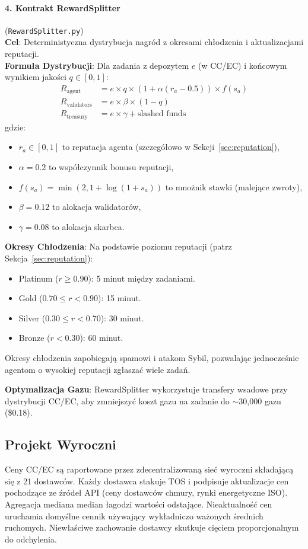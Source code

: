 \documentclass[11pt]{article}
\begin{document}
\paragraph{4. Kontrakt RewardSplitter} (\texttt{RewardSplitter.py})\\
\textbf{Cel}: Deterministyczna dystrybucja nagród z okresami chłodzenia i aktualizacjami reputacji.\\
\textbf{Formuła Dystrybucji}: Dla zadania z depozytem $e$ (w CC/EC) i końcowym wynikiem jakości $q \in [0,1]$:
\begin{align}
R_{\text{agent}} &= e \times q \times \left(1 + \alpha (r_a - 0.5)\right) \times f(s_a) \label{eq:reward-agent} \\
R_{\text{validators}} &= e \times \beta \times (1-q) \label{eq:reward-validators} \\
R_{\text{treasury}} &= e \times \gamma + \text{slashed funds} \label{eq:reward-treasury}
\end{align}
gdzie:
\begin{itemize}[noitemsep]
  \item $r_a \in [0,1]$ to reputacja agenta (szczegółowo w Sekcji~\ref{sec:reputation}),
  \item $\alpha = 0.2$ to współczynnik bonusu reputacji,
  \item $f(s_a) = \min(2, 1 + \log(1+s_a))$ to mnożnik stawki (malejące zwroty),
  \item $\beta = 0.12$ to alokacja walidatorów,
  \item $\gamma = 0.08$ to alokacja skarbca.
\end{itemize}
\textbf{Okresy Chłodzenia}: Na podstawie poziomu reputacji (patrz Sekcja~\ref{sec:reputation}):
\begin{itemize}[noitemsep]
  \item Platinum ($r \geq 0.90$): 5 minut między zadaniami.
  \item Gold ($0.70 \leq r < 0.90$): 15 minut.
  \item Silver ($0.30 \leq r < 0.70$): 30 minut.
  \item Bronze ($r < 0.30$): 60 minut.
\end{itemize}
Okresy chłodzenia zapobiegają spamowi i atakom Sybil, pozwalając jednocześnie agentom o wysokiej reputacji zgłaszać wiele zadań.

\textbf{Optymalizacja Gazu}: RewardSplitter wykorzystuje transfery wsadowe przy dystrybucji CC/EC, aby zmniejszyć koszt gazu na zadanie do $\sim$30,000 gazu (\$0.18).

\subsection{Projekt Wyroczni}
Ceny CC/EC są raportowane przez zdecentralizowaną sieć wyroczni składającą się z 21 dostawców. Każdy dostawca stakuje TOS i podpisuje aktualizacje cen pochodzące ze źródeł API (ceny dostawców chmury, rynki energetyczne ISO). Agregacja mediana median łagodzi wartości odstające. Nieaktualność cen uruchamia domyślne cennik używający wykładniczo ważonych średnich ruchomych. Niewłaściwe zachowanie dostawcy skutkuje cięciem proporcjonalnym do odchylenia.
\end{document}
